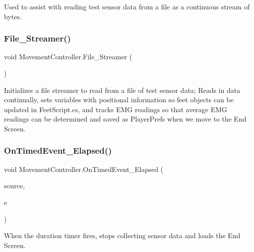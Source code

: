 Used to assist with reading test sensor data from a file as a continuous stream of bytes. \mbox{\label{class_movement_controller_a7df00ba99e9eb0a7c55fb9724e6bec1d}} 
\subsubsection{\texorpdfstring{File\+\_\+\+Streamer()}{File\_Streamer()}}
{\footnotesize\ttfamily void Movement\+Controller.\+File\+\_\+\+Streamer (\begin{DoxyParamCaption}{ }\end{DoxyParamCaption})\hspace{0.3cm}{\ttfamily [private]}}

Initializes a file streamer to read from a file of test sensor data; Reads in data continually, sets variables with positional information so feet objects can be updated in Feet\+Script.\+cs, and tracks E\+MG readings so that average E\+MG readings can be determined and saved as Player\+Prefs when we move to the End Screen. \mbox{\label{class_movement_controller_a60a8ed424efc24c04354f4741ed184c9}} 
\subsubsection{\texorpdfstring{On\+Timed\+Event\+\_\+\+Elapsed()}{OnTimedEvent\_Elapsed()}}
{\footnotesize\ttfamily void Movement\+Controller.\+On\+Timed\+Event\+\_\+\+Elapsed (\begin{DoxyParamCaption}\item[{System.\+Object}]{source,  }\item[{System.\+Timers.\+Elapsed\+Event\+Args}]{e }\end{DoxyParamCaption})\hspace{0.3cm}{\ttfamily [private]}}

When the duration timer fires, stops collecting sensor data and loads the End Screen. \mbox{\label{class_movement_controller_a6625f01290af846b3b61ea1e1432fb19}} 
